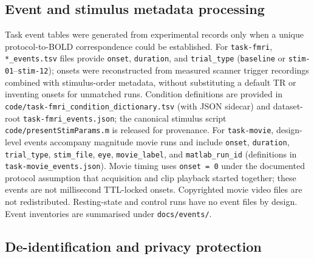 \subsection{Event and stimulus metadata processing}
\label{sec:events_processing}

Task event tables were generated from experimental records only when a unique protocol-to-BOLD correspondence could be established. For \texttt{task-fmri}, \texttt{*_events.tsv} files provide \texttt{onset}, \texttt{duration}, and \texttt{trial\_type} (\texttt{baseline} or \texttt{stim-01}--\texttt{stim-12}); onsets were reconstructed from measured scanner trigger recordings combined with stimulus-order metadata, without substituting a default TR or inventing onsets for unmatched runs. Condition definitions are provided in \texttt{code/task-fmri\_condition\_dictionary.tsv} (with JSON sidecar) and dataset-root \texttt{task-fmri\_events.json}; the canonical stimulus script \texttt{code/presentStimParams.m} is released for provenance. For \texttt{task-movie}, design-level events accompany magnitude movie runs and include \texttt{onset}, \texttt{duration}, \texttt{trial\_type}, \texttt{stim\_file}, \texttt{eye}, \texttt{movie\_label}, and \texttt{matlab\_run\_id} (definitions in \texttt{task-movie\_events.json}). Movie timing uses \texttt{onset = 0} under the documented protocol assumption that acquisition and clip playback started together; these events are not millisecond TTL-locked onsets. Copyrighted movie video files are not redistributed. Resting-state and control runs have no event files by design. Event inventories are summarised under \texttt{docs/events/}.

\subsection{De-identification and privacy protection}
\label{sec:deidentification}

